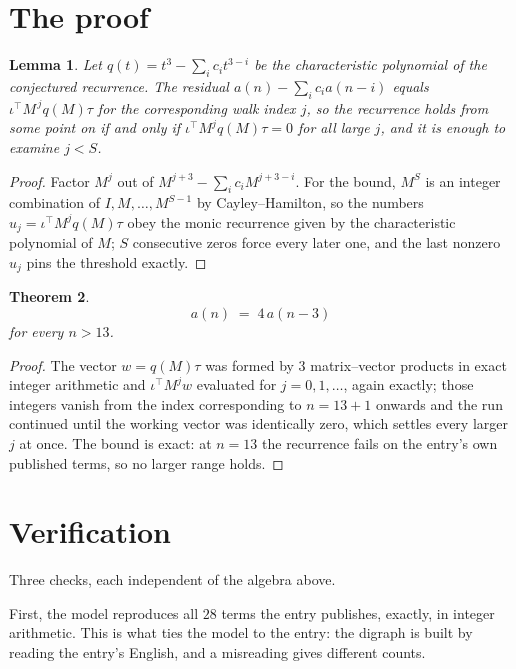 \documentclass[11pt,a4paper]{article}
\theoremstyle{plain}
\newtheorem{theorem}{Theorem}
\newtheorem{lemma}[theorem]{Lemma}
\theoremstyle{definition}
\begin{document}
\section{The proof}

\begin{lemma}\label{lem:crit}
Let $q(t)=t^{3}-\sum_i c_it^{3-i}$ be the characteristic polynomial of the
conjectured recurrence. The residual $a(n)-\sum_ic_ia(n-i)$ equals
$\iota^{\!\top}M^{\,j}q(M)\tau$ for the corresponding walk index $j$, so the recurrence
holds from some point on if and only if $\iota^{\!\top}M^{j}q(M)\tau=0$ for all large $j$,
and it is enough to examine $j<S$.
\end{lemma}

\begin{proof}
Factor $M^{j}$ out of $M^{j+3}-\sum_ic_iM^{j+3-i}$. For the bound, $M^{S}$
is an integer combination of $I,M,\dots,M^{S-1}$ by Cayley--Hamilton, so the numbers
$u_j=\iota^{\!\top}M^{j}q(M)\tau$ obey the monic recurrence given by the characteristic
polynomial of $M$; $S$ consecutive zeros force every later one, and the last nonzero $u_j$
pins the threshold exactly.
\end{proof}

\begin{theorem}
\[
a(n)\;=\;4\,a(n-3)
\]
for every $n>13$.
\end{theorem}

\begin{proof}
The vector $w=q(M)\tau$ was formed by $3$ matrix--vector products in exact integer
arithmetic and $\iota^{\!\top}M^{j}w$ evaluated for $j=0,1,\dots$, again exactly; those
integers vanish from the index corresponding to $n=13+1$ onwards and the run continued
until the working vector was identically zero, which settles every larger $j$ at once. The bound is exact: at $n=13$ the recurrence fails on the entry's own published terms, so no larger range holds.
\end{proof}

\section{Verification}

Three checks, each independent of the algebra above.

First, the model reproduces all $28$ terms the entry publishes, exactly, in integer
arithmetic. This is what ties the model to the entry: the digraph is built by reading the
entry's English, and a misreading gives different counts.
\end{document}
